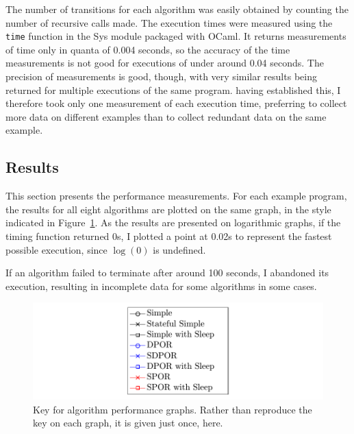 \documentclass[12pt,a4paper,twoside,openright]{report}
\begin{document}
The number of transitions for each algorithm was easily
obtained by counting the number of recursive calls made.
The execution times were measured using the \texttt{time}
function in the Sys module packaged with OCaml. It returns
measurements of time only in quanta of 0.004 seconds,
so the accuracy of the time measurements is not good for
executions of under around 0.04 seconds.
The precision of measurements
is good, though, with very similar results being returned
for multiple executions of the same program.
having established this,
I therefore took only one measurement
of each execution time, preferring
to collect more data on different examples than to collect
redundant data on the same example.

\subsection{Results}
This section presents the performance measurements.
For each example program, the results for all eight
algorithms are plotted on the same graph, in the
style indicated in Figure~\ref{fig:key}.
As the results are
presented on logarithmic graphs, if the timing function
returned 0s, I plotted a point at 0.02s
to represent the fastest possible execution, since
$\log(0)$ is undefined.

If an algorithm failed to terminate after around
100 seconds, I abandoned its execution,
resulting in incomplete data
for some algorithms in some cases.

\begin{figure}
	\includegraphics[width=\textwidth]{key}
	\caption[Key for algorithm performance graphs.]
	{Key for algorithm performance graphs.
		Rather than reproduce the key on each graph,
		it is given just once, here.}
	\label{fig:key}
\end{figure}
\end{document}
